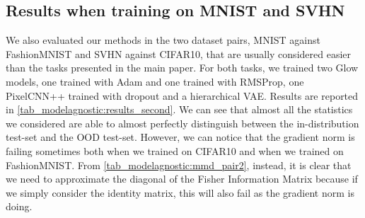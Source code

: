 {%

\subsection{Results when training on MNIST and SVHN}
\label{appendix_modelagnostic:mnist_svhn}
We also evaluated our methods in the two dataset pairs, MNIST against FashionMNIST and SVHN against CIFAR10, that are usually considered easier than the tasks presented in the main paper. For both tasks, we trained two Glow models, one trained with Adam and one trained with RMSProp, one PixelCNN++ trained with dropout and a hierarchical VAE. Results are reported in \cref{tab_modelagnostic:results_second}. We can see that almost all the statistics we considered are able to almost perfectly distinguish between the in-distribution test-set and the OOD test-set. However, we can notice that the gradient norm is failing sometimes both when we trained on CIFAR10 and when we trained on FashionMNIST. From \cref{tab_modelagnostic:mmd_pair2}, instead, it is clear that we need to approximate the diagonal of the Fisher Information Matrix because if we simply consider the identity matrix, this will also fail as the gradient norm is doing.


}
